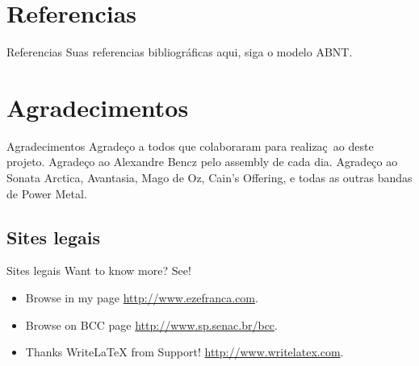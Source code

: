 \documentclass[handout,t]{beamer}
\begin{document}
\section{Referencias}
\begin{frame}{Referencias}
  Suas referencias bibliográficas aqui, siga o modelo ABNT.
\end{frame}

\section{Agradecimentos}
\begin{frame}{Agradecimentos}
Agradeço a todos que colaboraram  para realizaç~ao deste projeto.
Agradeço ao Alexandre Bencz pelo assembly de cada dia.
Agradeço ao Sonata Arctica, Avantasia, Mago de Oz, Cain's Offering, e todas as outras bandas de Power Metal. 	
\end{frame}

\subsection{Sites legais}
\begin{frame}{Sites legais}
  Want to know more? See!
  \begin{itemize}
    \item Browse in my page \url{http://www.ezefranca.com}.
    \item Browse on BCC page \url{http://www.sp.senac.br/bcc}.
    \item Thanks WriteLaTeX from Support! \url{http://www.writelatex.com}.
  \end{itemize}
  
\end{frame}

\end{document}
